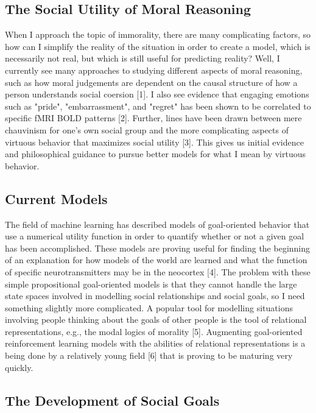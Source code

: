 \subsection{The Social Utility of Moral Reasoning}

When I approach the topic of immorality, there are many complicating
factors, so how can I simplify the reality of the situation in order
to create a model, which is necessarily not real, but which is still
useful for predicting reality? Well, I currently see many approaches
to studying different aspects of moral reasoning, such as how moral
judgements are dependent on the causal structure of how a person
understands social coersion [1]. I also see evidence that engaging
emotions such as "pride", "embarrassment", and "regret" has been shown
to be correlated to specific fMRI BOLD patterns [2]. Further, lines
have been drawn between mere chauvinism for one's own social group and
the more complicating aspects of virtuous behavior that maximizes
social utility [3]. This gives us initial evidence and philosophical
guidance to pursue better models for what I mean by virtuous
behavior.

\subsection{Current Models}

The field of machine learning has described models of goal-oriented
behavior that use a numerical utility function in order to quantify
whether or not a given goal has been accomplished. These models are
proving useful for finding the beginning of an explanation for how
models of the world are learned and what the function of specific
neurotransmitters may be in the neocortex [4]. The problem with these
simple propositional goal-oriented models is that they cannot handle
the large state spaces involved in modelling social relationships and
social goals, so I need something slightly more complicated. A
popular tool for modelling situations involving people thinking about
the goals of other people is the tool of relational representations,
e.g., the modal logics of morality [5]. Augmenting goal-oriented
reinforcement learning models with the abilities of relational
representations is a being done by a relatively young field [6] that
is proving to be maturing very quickly.

\subsection{The Development of Social Goals}

